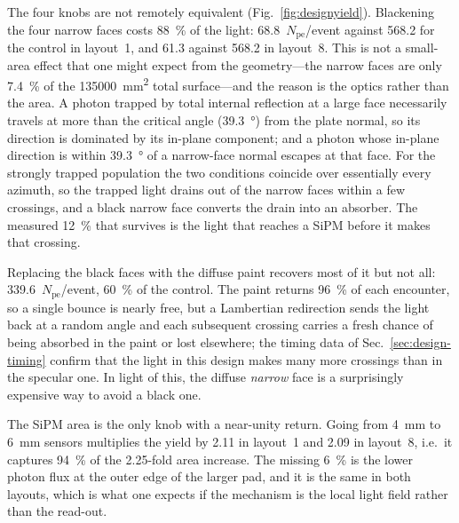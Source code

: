 \documentclass[11pt,a4paper]{article}
\newcommand{\pe}{\ensuremath{N_{\mathrm{pe}}}}
\begin{document}
The four knobs are not remotely equivalent
(Fig.~\ref{fig:designyield}). Blackening the four narrow faces costs
\SI{88}{\percent} of the light: \num{68.8}~\pe/event against
\num{568.2} for the control in layout~1, and \num{61.3} against \num{568.2}
in layout~8. This is not a small-area effect that one might expect from the
geometry---the narrow faces are only \SI{7.4}{\percent} of the
\SI{135000}{\milli\meter\squared} total surface---and the reason is the
optics rather than the area. A photon trapped by total internal reflection at
a large face necessarily travels at more than the critical angle
(\SI{39.3}{\degree}) from the plate normal, so its direction is dominated by
its in-plane component; and a photon whose in-plane direction is within
\SI{39.3}{\degree} of a narrow-face normal escapes at that face. For the
strongly trapped population the two conditions coincide over essentially every
azimuth, so the trapped light drains out of the narrow faces within a few
crossings, and a black narrow face converts the drain into an absorber. The measured
\SI{12}{\percent} that survives is the light that reaches a SiPM before it
makes that crossing.

Replacing the black faces with the diffuse paint recovers most of it but not
all: \num{339.6}~\pe/event, \SI{60}{\percent} of the control. The paint
returns \SI{96}{\percent} of each encounter, so a single bounce is nearly
free, but a Lambertian redirection sends the light back at a random angle and
each subsequent crossing carries a fresh chance of being absorbed in the paint
or lost elsewhere; the timing data of Sec.~\ref{sec:design-timing} confirm
that the light in this design makes many more crossings than in the
specular one. In light of this, the diffuse \emph{narrow} face is a
surprisingly expensive way to avoid a black one.

The SiPM area is the only knob with a near-unity return. Going from
\SI{4}{\milli\meter} to \SI{6}{\milli\meter} sensors multiplies the yield by
\num{2.11} in layout~1 and \num{2.09} in layout~8, i.e.\ it captures
\SI{94}{\percent} of the \num{2.25}-fold area increase. The missing
\SI{6}{\percent} is the lower photon flux at the outer edge of the larger
pad, and it is the same in both layouts, which is what one expects if the
mechanism is the local light field rather than the read-out.
\end{document}
